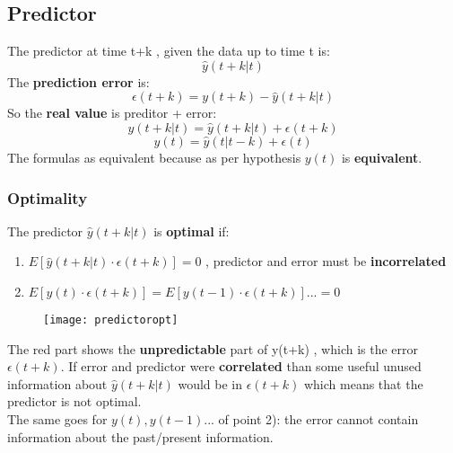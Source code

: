 \subsection{Predictor}
The predictor at time t+k , given the data up to time t is:
$$ \hat{y}(t+k|t) $$
The \textbf{prediction error} is: 
$$  \epsilon(t+k) = y(t+k)- \hat{y}(t + k|t)$$
So the \textbf{real value } is preditor + error:
$$ y(t+k|t) = \hat{y}(t+k|t) + \epsilon(t+k)$$
$$ y(t) = \hat{y}(t|t-k) + \epsilon(t) $$
The formulas as equivalent because as per hypothesis $y(t)$ is \textbf{equivalent}.
\subsubsection{Optimality}
The predictor $ \hat{y}(t+k|t) $ is \textbf{optimal} if:
\begin{enumerate}
\item $ E[\hat{y}(t+k|t) \cdot \epsilon(t+k)]=0 $ , predictor and error must be \textbf{incorrelated}
\item $ E[y(t) \cdot \epsilon(t+k)] = E[y(t-1) \cdot \epsilon(t+k)]... = 0$
\end{enumerate}
\begin{figure}[H]
 \centering
  \texttt{[image: predictoropt]}
\end{figure}
The red part shows the \textbf{unpredictable} part of y(t+k) , which is the error $\epsilon(t+k)$. If error and predictor were \textbf{correlated} than some useful unused information about $\hat{y}(t+k|t)$ would be in $\epsilon(t+k)$ which means that the predictor is not optimal.\\
The same goes for $y(t) , y(t-1)...$ of point 2): the error cannot contain information about the past/present information.\\

